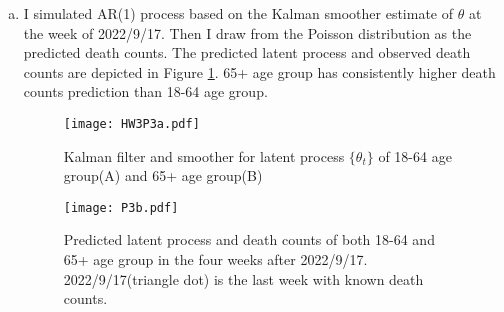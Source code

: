 \documentclass[12pt]{article}
\begin{document}
\begin{enumerate}[(a)]
	\item I simulated AR(1) process based on the Kalman smoother estimate of $\theta$ at the week of 2022/9/17. Then I draw from the Poisson distribution as the predicted death counts. The predicted latent process and observed death counts are depicted in Figure \ref{P3B}. 65+ age group has consistently higher death counts prediction than 18-64 age group.
	\begin{figure}[htbp]
		\centering
		\texttt{[image: HW3P3a.pdf]}
		\caption{Kalman filter and smoother for latent process $\{\theta_{t}\}$ of 18-64 age group(A) and 65+ age group(B)}\label{P3a}
		\texttt{[image: P3b.pdf]}
		\caption{Predicted latent process and death counts of both 18-64 and 65+ age group in the four weeks after 2022/9/17. 2022/9/17(triangle dot) is the last week with known death counts.}\label{P3B}
	\end{figure}
\end{enumerate}
	
\end{document}
